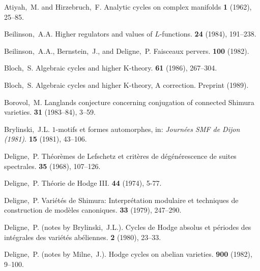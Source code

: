 \documentclass{article}
\theoremstyle{plain}
\theoremstyle{definition}
\begin{document}
\begin{thebibliography}{34}

  {\sc Atiyah,~M. and Hirzebruch,~F.}
  \newblock Analytic cycles on complex manifolds
   \textbf{1} (1962), 25--85.

  {\sc Beilinson,~A.A.}
  \newblock Higher regulators and values of $L$-functions.
   \textbf{24} (1984), 191--238.

  {\sc Beilinson,~A.A., Bernstein,~J., and Deligne,~P.}
  \newblock Faisceaux pervers.
   \textbf{100} (1982).

  {\sc Bloch,~S.}
  \newblock Algebraic cycles and higher K-theory.
   \textbf{61} (1986), 267--304.

  {\sc Bloch,~S.}
  \newblock Algebraic cycles and higher K-theory, A correction.
  \newblock Preprint (1989).

  {\sc Borovol,~M.}
  \newblock Langlands conjecture concerning conjugation of connected Shimura varieties.
   \textbf{31} (1983--84), 3--59.

  {\sc Brylinski,~J.L.}
  \newblock $1$-motifs et formes automorphes, in: {\em Journ\'{e}es SMF de Dijon (1981)}.
   \textbf{15} (1981), 43--106.

  {\sc Deligne,~P.}
  \newblock Th\'{e}or\`{e}mes de Lefschetz et crit\`{e}res de d\'{e}g\'{e}n\'{e}rescence de suites spectrales.
   \textbf{35} (1968), 107--126.

  {\sc Deligne,~P.}
  \newblock Th\'{e}orie de Hodge III.
   \textbf{44} (1974), 5-77.

  {\sc Deligne,~P.}
  \newblock Vari\'{e}t\'{e}s de Shimura: Interpr\'{e}tation modulaire et techniques de construction de mod\`{e}les canoniques.
   \textbf{33} (1979), 247--290.

  {\sc Deligne,~P. (notes by Brylinski,~J.L.).}
  \newblock Cycles de Hodge absolus et p\'{e}riodes des int\'{e}grales des vari\'{e}t\'{e}s ab\'{e}liennes.
   \textbf{2} (1980), 23--33.

  {\sc Deligne,~P. (notes by Milne,~J.).}
  \newblock Hodge cycles on abelian varieties.
   \textbf{900} (1982), 9--100.


\end{thebibliography}
\end{document}
